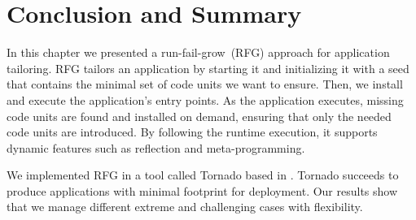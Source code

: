 %
%
%



\section{Conclusion and Summary}

In this chapter we presented a run-fail-grow~(RFG) approach for application tailoring. RFG tailors an application by starting it and initializing it with a seed that contains the minimal set of code units we want to ensure. Then, we install and execute the application's entry points. As the application executes, missing code units are found and installed on demand, ensuring that only the needed code units are introduced. By following the runtime execution, it supports dynamic features such as reflection and meta-programming.

We implemented RFG in a tool called Tornado based in \Vtt. Tornado succeeds to produce applications with minimal footprint for deployment. Our results show that we manage different extreme and challenging cases with flexibility.

